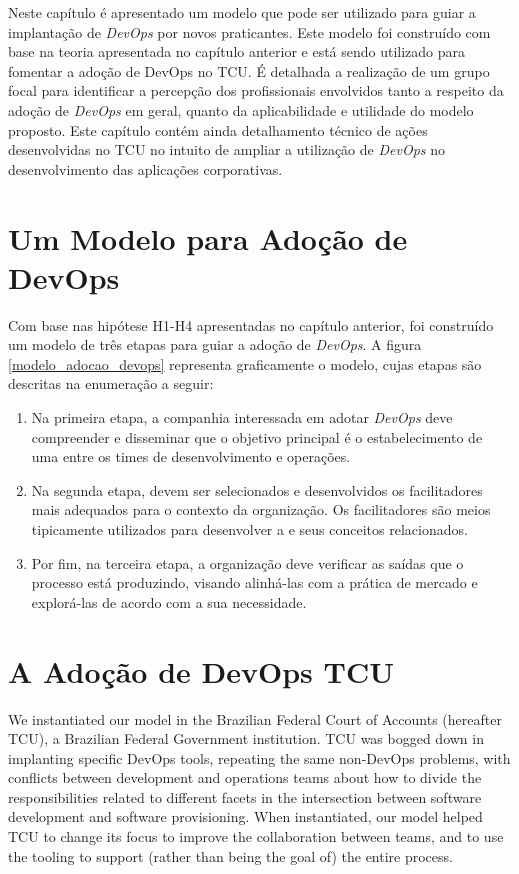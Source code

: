 Neste capítulo é apresentado um modelo que pode ser utilizado para guiar a
implantação de \textit{DevOps} por novos praticantes. Este modelo foi construído
com base na teoria apresentada no capítulo anterior e está sendo
utilizado para fomentar a adoção de DevOps no \acrshort{TCU}. É detalhada a
realização de um grupo focal \cite{focus_group_handbook,shull2007guide} para
identificar a percepção dos profissionais envolvidos tanto a respeito da adoção
de {\it DevOps} em geral, quanto da aplicabilidade e utilidade do modelo proposto.
Este capítulo contém ainda detalhamento técnico de ações desenvolvidas no
\acrshort{TCU} no intuito de ampliar a utilização de {\it DevOps} no
desenvolvimento das aplicações corporativas.

\section{Um Modelo para Adoção de DevOps}

Com base nas hipótese H1-H4 apresentadas no capítulo anterior, foi construído
um modelo de três etapas para guiar a adoção de {\it DevOps}. A figura \ref{modelo_adocao_devops}
representa graficamente o modelo, cujas etapas são descritas na enumeração a
seguir:

\begin{enumerate}
\item Na primeira etapa, a companhia interessada em adotar {\it DevOps} deve
compreender e disseminar que o objetivo principal é o estabelecimento de uma
\cc entre os times de desenvolvimento e operações.

\item Na segunda etapa, devem ser selecionados e desenvolvidos os facilitadores
mais adequados para o contexto da organização. Os facilitadores são meios
tipicamente utilizados para desenvolver a \cc e seus conceitos relacionados.

\item Por fim, na terceira etapa, a organização deve verificar as saídas que o
processo está produzindo, visando alinhá-las com a prática de mercado e
explorá-las de acordo com a sua necessidade.

\end{enumerate}


\section{A Adoção de DevOps \acrshort{TCU}}
We instantiated our model in the Brazilian Federal Court of Accounts (hereafter TCU), a Brazilian Federal
Government institution. TCU was bogged down in implanting specific DevOps tools, repeating the same non-DevOps problems, with
conflicts between development and operations teams about how to divide the responsibilities related to different facets in the intersection between software development and software provisioning.
When instantiated, our model helped TCU to change its focus to
improve the collaboration between teams, and to use the tooling
to support (rather than being the goal of) the entire process.

